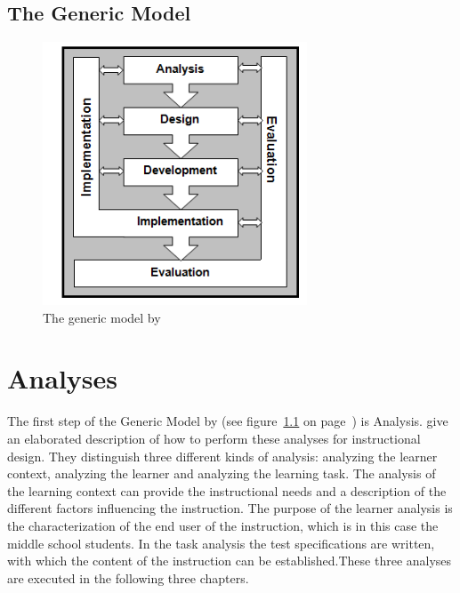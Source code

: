 \documentclass[12pt]{report} %
\begin{document}

\chapter{The Generic Model}

\begin{figure}[h]
\centering
\includegraphics[width=0.7\textwidth]{genericmodel}
\caption{\footnotesize The generic model by \protect{}\label{fig:genericmodel}}
\end{figure}

\part{Analyses}

The first step of the Generic Model by  (see figure~\ref{fig:genericmodel} on page~\pageref{fig:genericmodel}) is Analysis.  give an elaborated description of how to perform these analyses for instructional design. They distinguish three different kinds of analysis: analyzing the learner context, analyzing the learner and analyzing the learning task. The analysis of the learning context can provide the instructional needs and a description of the different factors influencing the instruction. The purpose of the learner analysis is the characterization of the end user of the instruction, which is in this case the middle school students. In the task analysis the test specifications are written, with which the content of the instruction can be established.These three analyses are executed in the following three chapters.

\end{document}
